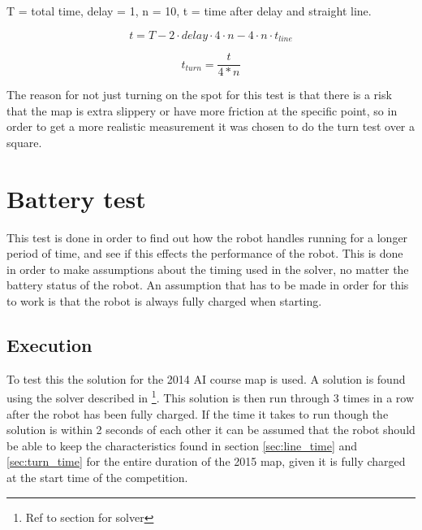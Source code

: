 \documentclass[a4paper,10pt]{article}
\begin{document}
T = total time, delay = 1, n = 10, t = time after delay and straight line.

\begin{equation}
t = T - 2\cdot delay\cdot 4\cdot n - 4\cdot n\cdot t_{line}
\end{equation}

\begin{equation}
t_{turn} = \frac{t}{4*n}
\end{equation}

The reason for not just turning on the spot for this test is that there is a risk that the map is extra slippery or have more friction at the specific point, so in order to get a more realistic measurement it was chosen to do the turn test over a square. 

\section{Battery test}
This test is done in order to find out how the robot handles running for a longer period of time, and see if this effects the performance of the robot. This is done in order to make assumptions about the timing used in the solver, no matter the battery status of the robot. An assumption that has to be made in order for this to work is that the robot is always fully charged when starting.

\subsection{Execution}
To test this the solution for the 2014 AI course map is used. A solution is found using the solver described in \footnote{Ref to section for solver}. This solution is then run through 3 times in a row after the robot has been fully charged. If the time it takes to run though the solution is within 2 seconds of each other it can be assumed that the robot should be able to keep the characteristics found in section \ref{sec:line_time} and \ref{sec:turn_time} for the entire duration of the 2015 map, given it is fully charged at the start time of the competition.
\end{document}
